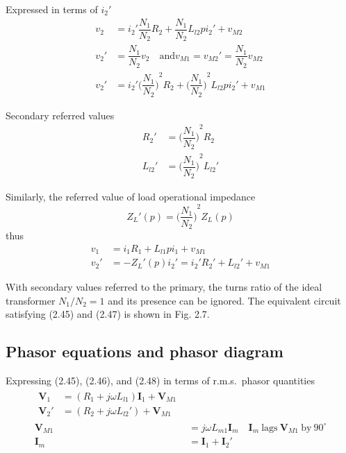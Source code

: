 \documentclass[a4paper,numbers=noenddot,12pt]{scrbook}
\begin{document}
                Expressed in terms of $i_2'$
                \begin{align*}
                    v_2 & = i_2' \dfrac{N_1}{N_2} R_2 + \dfrac{N_1}{N_2} L_{l2} p i_2' + v_{M2} \\
                    v_2' & = \dfrac{N_1}{N_2} v_2 \quad \text{and} v_{M1} = v_{M2}' = \dfrac{N_1}{N_2} v_{M2} \\
                    v_2' & = i_2' {\Big(\dfrac{N_1}{N_2}\Big)}^2 R_2 + {\Big(\dfrac{N_1}{N_2}\Big)}^2 L_{l2} p i_2' + v_{M1}
                \end{align*}

                Secondary referred values
                \begin{align*}
                    R_2' & = {\Big(\dfrac{N_1}{N_2}\Big)}^2 R_2 \\
                    L_{l2}' & = {\Big(\dfrac{N_1}{N_2}\Big)}^2 L_{l2}'
                \end{align*}

                Similarly, the referred value of load operational impedance
                \begin{equation*}
                    Z_{L}' (p) = {\Big(\dfrac{N_1}{N_2}\Big)}^2 Z_L (p)
                \end{equation*}
                thus
                \begin{align}
                    v_1 & = i_1 R_1 + L_{l1} p i_1 + v_{M1} \nonumber \\
                    v_2' & = - Z_L' (p) i_2' = i_2' R_2' + L_{l2}' + v_{M1}
                    \label{eq:Eq2.48}
                \end{align}

                With secondary values referred to the primary, the turns ratio of the ideal transformer $N_1/N_2 = 1$ and its presence can be ignored. The equivalent circuit satisfying (2.45) and (2.47) is shown in Fig. 2.7. 


                \subsection{Phasor equations and phasor diagram}
                Expressing (2.45), (2.46), and (2.48) in terms of r.m.s.\ phasor quantities
                \begin{align}
                    \begin{split}
                        \mathbf{V}_1 & = (R_1 + j\omega L_{l1}) \mathbf{I}_1 + \mathbf{V}_{M1} \\
                        \mathbf{V}_2' & = (R_2 + j\omega L_{l2}') + \mathbf{V}_{M1}
                    \end{split}\\
                    \mathbf{V}_{M1} & = j\omega L_{m1} \mathbf{I}_m \quad \mathbf{I}_m\ \text{lags}\ \mathbf{V}_{M1} \ \text{by} \ 90^\circ \\
                    \mathbf{I}_m & = \mathbf{I}_1 + \mathbf{I}_2'
                    \label{eq:Eq2.49}
                \end{align}
\end{document}

